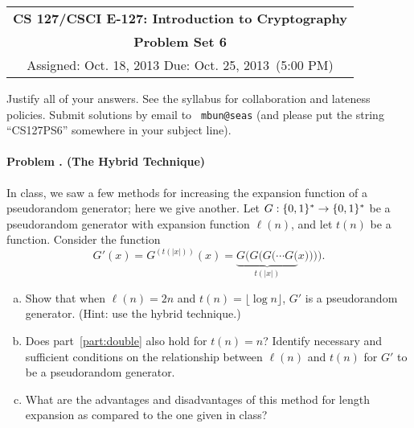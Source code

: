 \documentclass[11pt]{article}
\newcommand{\psnum}{6}
\newcommand{\assdate}{Oct. 18, 2013 \hspace{-5em}}
\newcommand{\duedate}{Oct. 25, 2013}
\newcounter{problem}
\newenvironment{problem}[1]{\stepcounter{problem}
\paragraph{Problem \theproblem. #1}}{}
\begin{document}
\begin{center}
\renewcommand{\arraystretch}{2}
\begin{tabular}{|c|}
\hline
{\large \bfseries CS 127/CSCI E-127: Introduction to Cryptography} \\

{\large \bfseries Problem Set \psnum}\\
Assigned: \assdate
\hspace{20em} Due: \duedate\ (5:00 PM)\\
\hline
\end{tabular}
\renewcommand{\arraystretch}{1}
\end{center}
\vspace{1cm}

\noindent Justify all of your answers.  See the syllabus for
collaboration and lateness policies. Submit solutions by email to {\tt
mbun@seas} (and please put the string ``CS127PS\psnum'' somewhere in your subject line).





\begin{problem}{(The Hybrid Technique)}
In class, we saw a few methods for increasing the expansion function of
a pseudorandom generator; here we give another.  Let $G :
\{0,1\}^*\rightarrow \{0,1\}^*$ be a pseudorandom generator with expansion
function $\ell(n)$, and let $t(n)$ be a function.  Consider the
function
$$G'(x)=G^{(t(|x|))}(x)=\underbrace{G(G(G(\cdots G(}_{t(|x|)}x)))).$$

\begin{enumerate}[a)]
\item Show that when $\ell(n) = 2n$ and $t(n) = \lfloor\log n\rfloor$, $G'$ is a
pseudorandom generator. (Hint: use the hybrid technique.)
\label{part:double}

\item Does part~\ref{part:double} also hold for $t(n)=n$?  Identify
necessary and sufficient conditions on the relationship between
$\ell(n)$ and $t(n)$ for $G'$ to be a pseudorandom generator.

\item What are the advantages and disadvantages of this method for length expansion
as compared to the one given in class?
\end{enumerate}
\end{problem}
\end{document}
